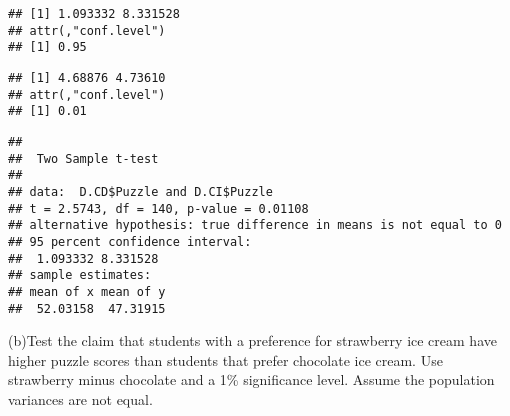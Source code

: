 \documentclass[
]{article}
\newenvironment{Shaded}{\begin{snugshade}}{\end{snugshade}}
\newcommand{\CommentTok}[1]{\textcolor[rgb]{0.56,0.35,0.01}{\textit{#1}}}
\newcommand{\DataTypeTok}[1]{\textcolor[rgb]{0.13,0.29,0.53}{#1}}
\newcommand{\FloatTok}[1]{\textcolor[rgb]{0.00,0.00,0.81}{#1}}
\newcommand{\KeywordTok}[1]{\textcolor[rgb]{0.13,0.29,0.53}{\textbf{#1}}}
\newcommand{\NormalTok}[1]{#1}
\newcommand{\OperatorTok}[1]{\textcolor[rgb]{0.81,0.36,0.00}{\textbf{#1}}}
\newcommand{\OtherTok}[1]{\textcolor[rgb]{0.56,0.35,0.01}{#1}}
\newcommand{\StringTok}[1]{\textcolor[rgb]{0.31,0.60,0.02}{#1}}
\begin{document}
\begin{verbatim}
## [1] 1.093332 8.331528
## attr(,"conf.level")
## [1] 0.95
\end{verbatim}

\begin{Shaded}
\end{Shaded}

\begin{verbatim}
## [1] 4.68876 4.73610
## attr(,"conf.level")
## [1] 0.01
\end{verbatim}

\begin{Shaded}
\end{Shaded}

\begin{verbatim}
## 
##  Two Sample t-test
## 
## data:  D.CD$Puzzle and D.CI$Puzzle
## t = 2.5743, df = 140, p-value = 0.01108
## alternative hypothesis: true difference in means is not equal to 0
## 95 percent confidence interval:
##  1.093332 8.331528
## sample estimates:
## mean of x mean of y 
##  52.03158  47.31915
\end{verbatim}

(b)Test the claim that students with a preference for strawberry ice
cream have higher puzzle scores than students that prefer chocolate ice
cream. Use strawberry minus chocolate and a 1\% significance level.
Assume the population variances are not equal.

\begin{Shaded}
\end{Shaded}
\end{document}
